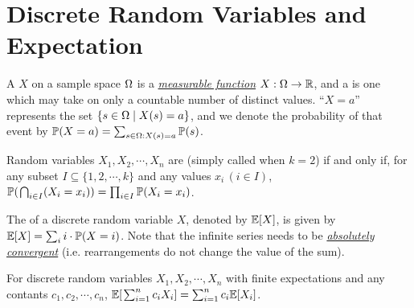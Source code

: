 \documentclass[main.tex]{subfiles}
\begin{document}
\minispacing

\section{Discrete Random Variables and Expectation}

A  $X$ on a sample space $\Omega$ is a \href{https://en.wikipedia.org/wiki/Measurable_function}{\it measurable function} $X:\Omega \rightarrow \mathbb{R}$, and a  is one which may take on only a countable number of distinct values. ``$X=a$'' represents the set $\{s \in \Omega \mid X(s) = a\}$, and we denote the probability of that event by $\mathbb{P}(X=a)=\sum_{s\in\Omega:X(s)=a}\mathbb{P}(s)$.

Random variables $X_1,X_2,\cdots,X_n$ are  (simply called  when $k=2$) if and only if, for any subset $I \subseteq \{1,2,\cdots,k\}$ and any values $x_i\,(i\in I)$, $\mathbb{P}(\;\!\bigcap_{i\in I}(X_i=x_i))=\prod_{i\in I}\mathbb{P}(X_i=x_i)$.

The  of a discrete random variable $X$, denoted by $\mathbb{E}[X]$, is given by $\mathbb{E}[X]=\sum_{i} i \cdot \mathbb{P}(X=i)$. Note that the infinite series needs to be \href{https://en.wikipedia.org/wiki/Absolute_convergence}{\it absolutely convergent} (i.e. rearrangements do not change the value of the sum).

\begin{theorem}
	For discrete random variables $X_1,X_2,\cdots,X_n$ with finite expectations and any contants $c_1,c_2,\cdots,c_n$,
	$\mathbb{E}[\;\!\sum_{i=1}^{n}c_iX_i]=\sum_{i=1}^{n}c_i\mathbb{E}[X_i]$.
\end{theorem}
\end{document}
